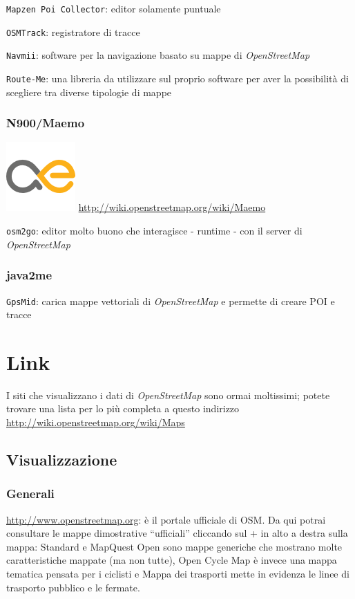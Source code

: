 \documentclass[a4paper,twoside,12pt,]{article}
\newcommand{\osm}{\emph{OpenStreetMap}\xspace}
\newcommand{\soft}[1]{\texttt{#1}}
\begin{document}
\soft{Mapzen Poi Collector}: editor solamente puntuale

\soft{OSMTrack}: registratore di tracce

\soft{Navmii}: software per la navigazione basato su mappe di \osm

\soft{Route-Me}: una libreria da utilizzare sul proprio software per aver la possibilità di scegliere tra diverse tipologie di mappe
\subsubsection{N900/Maemo} 
\includegraphics{./maemo-logo.png} \url{http://wiki.openstreetmap.org/wiki/Maemo}

\soft{osm2go}: editor molto buono che interagisce - runtime - con il server di \osm

\subsubsection{java2me}

\soft{GpsMid}: carica mappe vettoriali di \osm e permette di creare POI e tracce

\section{Link}
I siti che visualizzano i dati di \osm sono ormai moltissimi; potete trovare una lista per lo più completa a questo indirizzo \url{http://wiki.openstreetmap.org/wiki/Maps}
\subsection{Visualizzazione}
\subsubsection{Generali}
\url{http://www.openstreetmap.org}: è il portale ufficiale di OSM. Da qui potrai consultare le mappe dimostrative “ufficiali” cliccando sul + in alto a destra sulla mappa:
Standard e MapQuest Open sono mappe generiche che mostrano molte caratteristiche mappate (ma non tutte), Open Cycle Map è invece una mappa tematica pensata per i ciclisti e Mappa dei trasporti mette in evidenza le linee di trasporto
pubblico e le fermate.
\end{document}
